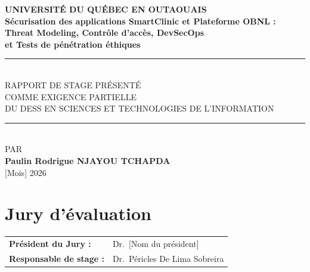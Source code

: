 \documentclass[12pt, a4paper, oneside]{report}
\begin{document}

\begin{titlepage}
  \centering
  \vspace*{0.5cm}


  {\Large\bfseries UNIVERSITÉ DU QUÉBEC EN OUTAOUAIS}\\[1.5cm]

  {\large\bfseries
    Sécurisation des applications SmartClinic et Plateforme OBNL :\\[0.3cm]
    Threat Modeling, Contrôle d'accès, DevSecOps\\
    et Tests de pénétration éthiques
  }\\[1.5cm]

  \rule{\linewidth}{0.8pt}\\[0.4cm]
  {\normalsize
    RAPPORT DE STAGE PRÉSENTÉ\\
    COMME EXIGENCE PARTIELLE\\
    DU DESS EN SCIENCES ET TECHNOLOGIES DE L'INFORMATION
  }\\[0.4cm]
  \rule{\linewidth}{0.8pt}\\[1.5cm]

  {\large PAR}\\[0.5cm]
  {\Large\bfseries Paulin Rodrigue NJAYOU TCHAPDA}\\[2cm]

  {\large [Mois] 2026}
\end{titlepage}

\setcounter{page}{1}

\chapter*{Jury d'évaluation}
\vspace{1cm}
\begin{tabular}{ll}
  \textbf{Président du Jury :}    & Dr.\ [Nom du président]     \\[0.6cm]
  \textbf{Responsable de stage :} & Dr.\ Péricles De Lima Sobreira         \\
\end{tabular}
\clearpage
\end{document}
